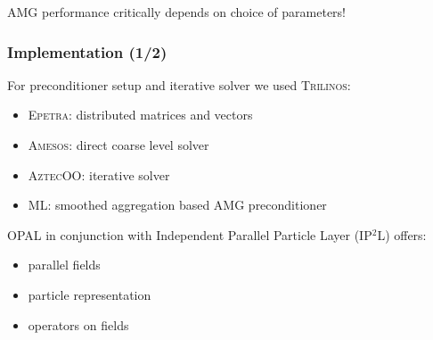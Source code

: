 \documentclass[xcolor=pdftex,table,10pt]{beamer}
\newcommand{\opal}{\textsc{OPAL }}
\begin{document}
\begin{frame}
            \vspace{0.3cm}
            \alert{AMG performance critically depends on choice of parameters!}

	\end{frame}

	\begin{frame}
		\frametitle{Implementation (1/2)}

		For preconditioner setup and iterative solver we used \textsc{Trilinos}:
		\begin{itemize}
			\item \textsc{Epetra}: distributed matrices and vectors
			\item \textsc{Amesos}: direct coarse level solver
			\item \textsc{AztecOO}: iterative solver
			\item \textsc{ML}: smoothed aggregation based AMG preconditioner
		\end{itemize}

		\vspace{0.8cm}

		\opal in conjunction with Independent Parallel Particle Layer (\textsc{IP$^2$L}) offers:
		\begin{itemize}
			\item parallel fields
			\item particle representation
			\item operators on fields
		\end{itemize}

	\end{frame}
\end{document}
